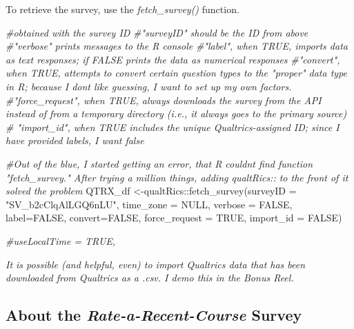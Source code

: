 \documentclass[
  english,
]{book}
\newenvironment{Shaded}{\begin{snugshade}}{\end{snugshade}}
\newcommand{\AttributeTok}[1]{\textcolor[rgb]{0.77,0.63,0.00}{#1}}
\newcommand{\CommentTok}[1]{\textcolor[rgb]{0.56,0.35,0.01}{\textit{#1}}}
\newcommand{\ConstantTok}[1]{\textcolor[rgb]{0.00,0.00,0.00}{#1}}
\newcommand{\FunctionTok}[1]{\textcolor[rgb]{0.00,0.00,0.00}{#1}}
\newcommand{\NormalTok}[1]{#1}
\newcommand{\OtherTok}[1]{\textcolor[rgb]{0.56,0.35,0.01}{#1}}
\newcommand{\SpecialCharTok}[1]{\textcolor[rgb]{0.00,0.00,0.00}{#1}}
\newcommand{\StringTok}[1]{\textcolor[rgb]{0.31,0.60,0.02}{#1}}
\begin{document}
To retrieve the survey, use the \emph{fetch\_survey()} function.

\begin{Shaded}
\begin{Highlighting}[]
\CommentTok{\#obtained with the survey ID }
\CommentTok{\#"surveyID" should be the ID from above}
\CommentTok{\#"verbose" prints messages to the R console}
\CommentTok{\#"label", when TRUE, imports data as text responses; if FALSE prints the data as numerical responses}
\CommentTok{\#"convert", when TRUE, attempts to convert certain question types to the "proper" data type in R; because I don\textquotesingle{}t like guessing, I want to set up my own factors.}
\CommentTok{\#"force\_request", when TRUE, always downloads the survey from the API instead of from a temporary directory (i.e., it always goes to the primary source)}
\CommentTok{\# "import\_id", when TRUE includes the unique Qualtrics{-}assigned ID; since I have provided labels, I want false}

\CommentTok{\#Out of the blue, I started getting an error, that R couldn\textquotesingle{}t find function "fetch\_survey."  After trying a million things, adding qualtRics:: to the front of it solved the problem}
\NormalTok{QTRX\_df }\OtherTok{\textless{}{-}}\NormalTok{qualtRics}\SpecialCharTok{::}\FunctionTok{fetch\_survey}\NormalTok{(}\AttributeTok{surveyID =} \StringTok{"SV\_b2cClqAlLGQ6nLU"}\NormalTok{, }\AttributeTok{time\_zone =} \ConstantTok{NULL}\NormalTok{, }\AttributeTok{verbose =} \ConstantTok{FALSE}\NormalTok{, }\AttributeTok{label=}\ConstantTok{FALSE}\NormalTok{, }\AttributeTok{convert=}\ConstantTok{FALSE}\NormalTok{, }\AttributeTok{force\_request =} \ConstantTok{TRUE}\NormalTok{, }\AttributeTok{import\_id =} \ConstantTok{FALSE}\NormalTok{)}

\CommentTok{\#useLocalTime = TRUE,}
\end{Highlighting}
\end{Shaded}

\emph{It is possible (and helpful, even) to import Qualtrics data that has been downloaded from Qualtrics as a .csv. I demo this in the Bonus Reel.}

\hypertarget{about-the-rate-a-recent-course-survey}{%
\subsection{\texorpdfstring{About the \emph{Rate-a-Recent-Course} Survey}{About the Rate-a-Recent-Course Survey}}\label{about-the-rate-a-recent-course-survey}}
\end{document}
